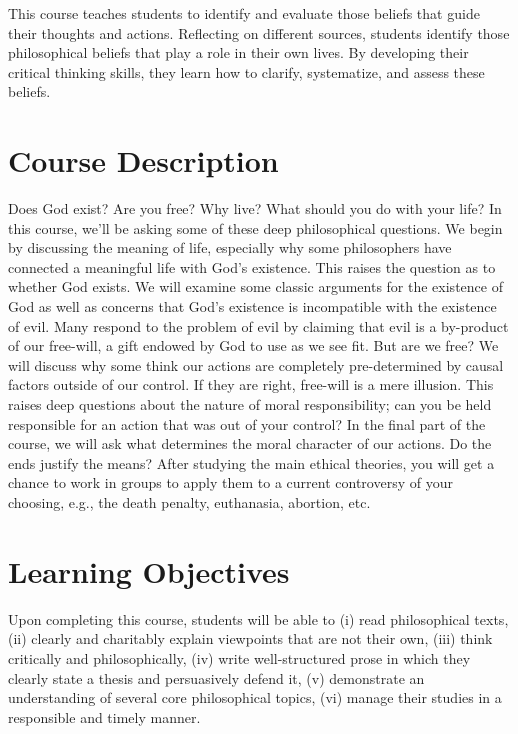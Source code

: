 \documentclass[11pt,article,oneside]{memoir}
\begin{document}
This course teaches students to identify and evaluate those beliefs that guide their thoughts and actions. Reflecting on different sources, students identify those philosophical beliefs that play a role in their own lives. By developing their critical thinking skills, they learn how to clarify, systematize, and assess these beliefs. 

\section{Course Description}

Does God exist? Are you free? Why live? What should you do with your life?  In this course, we'll be asking some of these deep philosophical questions. We begin by discussing the meaning of life, especially why some philosophers have connected a meaningful life with God's existence. This raises the question as to whether God exists. We will examine some classic arguments for the existence of God as well as concerns that God's existence is incompatible with the existence of evil. Many respond to the problem of evil by claiming that evil is a by-product of our free-will, a gift endowed by God to use as we see fit. But are we free? We will discuss why some think our actions are completely pre-determined by causal factors outside of our control. If they are right, free-will is a mere illusion. This raises deep questions about the nature of moral responsibility; can you be held responsible for an action that was out of your control? In the final part of the course, we will ask what determines the moral character of our actions. Do the ends justify the means? After studying the main ethical theories, you will get a chance to work in groups to apply them to a current controversy of your choosing, e.g., the death penalty, euthanasia, abortion, etc. 

\section{Learning Objectives}

Upon completing this course, students will be able to (i) read
philosophical texts, (ii) clearly and charitably explain viewpoints that
are not their own, (iii) think critically and philosophically, (iv)
write well-structured prose in which they clearly state a thesis and
persuasively defend it, (v) demonstrate an understanding of several core
philosophical topics, (vi) manage their studies in a responsible and timely manner. 
\end{document}
